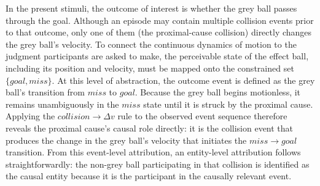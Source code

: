 \documentclass[10pt,letterpaper]{article}
\begin{document}
In the present stimuli, the outcome of interest is whether the grey ball passes through the goal. Although an episode may contain multiple collision events prior to that outcome, only one of them (the proximal-cause collision) directly changes the grey ball’s velocity. To connect the continuous dynamics of motion to the judgment participants are asked to make, the perceivable state of the effect ball, including its position and velocity, must be mapped onto the constrained set $\{goal, miss\}$. At this level of abstraction, the outcome event is defined as the grey ball’s transition from $miss$ to $goal$. Because the grey ball begins motionless, it remains unambiguously in the $miss$ state until it is struck by the proximal cause. Applying the $\mathit{collision} \rightarrow \Delta v$ rule to the observed event sequence therefore reveals the proximal cause’s causal role directly: it is the collision event that produces the change in the grey ball’s velocity that initiates the $miss \rightarrow goal$ transition. From this event-level attribution, an entity-level attribution follows straightforwardly: the non-grey ball participating in that collision is identified as the causal entity because it is the participant in the causally relevant event.
\end{document}
